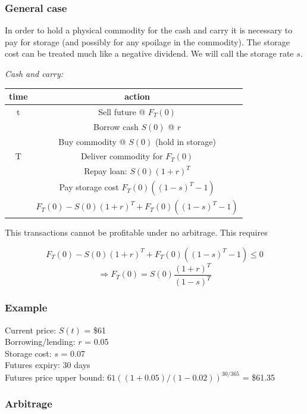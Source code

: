 \subsubsection{General case}

In order to hold a physical commodity for the cash and carry it is necessary to pay for storage (and possibly for any spoilage in the commodity). The storage cost can be treated much like a negative dividend. We will call the storage rate $s$.

\textit{Cash and carry:}


\begin{center} \begin{tabular}{|c|c|}
  \hline
  time & action \\
  \hline
  t & Sell future @ $F_T(0)$  \\
    & Borrow cash $S(0)$ @ $r$ \\
    & Buy commodity @ $S(0)$ (hold in storage) \\
  \hline
 T & Deliver commodity for $F_T(0)$ \\
   & Repay loan: $S(0)(1+r)^{T} $ \\
   & Pay storage cost $F_T(0)((1-s)^{T}-1)$\\
  \hline
   & $F_T(0) - S(0)(1+r)^{T} + F_T(0)((1-s)^{T}-1)$\\
  \hline
\end{tabular}\end{center}


This transactions cannot be profitable under no arbitrage. This requires

\[F_T(0) - S(0)(1+r)^{T} + F_T(0)((1-s)^{T}-1) \leq 0 \]
\[ \Rightarrow F_T(0) = S(0)\frac{(1+r)^{T}}{(1-s)^{T}}  \]

\subsubsection{Example}

Current price: $S(t)$ = \$61\\
Borrowing/lending: $r$ = 0.05\\
Storage cost: $s$ = 0.07\\
Futures expiry: 30 days\\
Futures price upper  bound: $61((1+0.05)/(1-0.02))^{30/365}$ = \$61.35

\subsubsection{Arbitrage}

